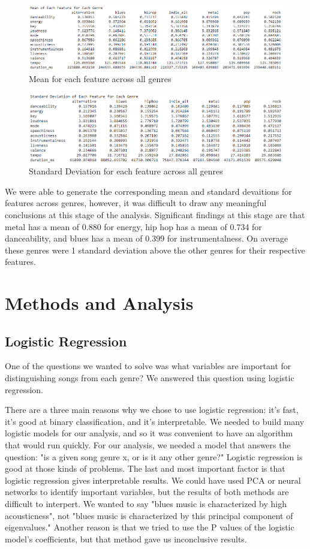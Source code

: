 \documentclass[11pt, a4paper, twocolumn]{article}
\begin{document}
\begin{figure}[htb!]
\centerline{\includegraphics[scale=0.3]{Stats_Mean}}
\caption{Mean for each feature across all genres}
\end{figure}
\begin{figure}[htb!]
\centerline{\includegraphics[scale=0.3]{Stats_SD}}
\caption{Standard Deviation for each feature across all genres}
\end{figure}
We were able to generate the corresponding mean and standard devaitions for features across genres, however, it was difficult to draw any meaningful conclusions at this stage of the analysis. Significant findings at this stage are that metal has a mean of 0.880 for energy, hip hop has a mean of 0.734 for danceability, and blues has a mean of 0.399 for instrumentalness. On average these genres were 1 standard deviation above the other genres for their respective features.
\section{Methods and Analysis}
\subsection{Logistic Regression}
One of the questions we wanted to solve was what variables are important for distinguishing songs from each genre? We answered this question using logistic regression.

There are a three main reasons why we chose to use logistic regression: it's fast, it's good at binary classification, and it's interpretable. We needed to build many logistic models for our analysis, and so it was convenient to have an algorithm that would run quickly. For our analysis, we needed a model that answers the question: "is a given song genre x, or is it any other genre?" Logistic regression is good at those kinds of problems. The last and most important factor is that logistic regression gives interpretable results. We could have used PCA or neural networks to identify important variables, but the results of both methods are difficult to interpert. We wanted to say "blues music is characterized by high acousticness", not "blues music is characterized by this principal component of eigenvalues." Another reason is that we tried to use the P values of the logistic model's coefficients, but that method gave us inconclusive results.
\end{document}
